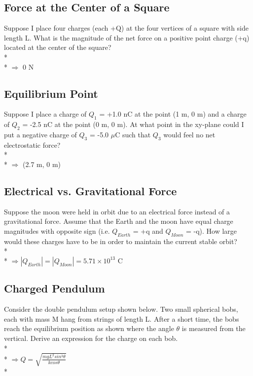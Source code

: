\documentclass[11pt]{article}
\begin{document}
\subsection{Force at the Center of a Square}
Suppose I place four charges (each +Q) at the four vertices of a square with side length L.  What is the magnitude of the net force on a positive point charge (+q) located at the center of the square? \\* \\*
$\Rightarrow$ 0 N

\subsection{Equilibrium Point}
Suppose I place a charge of $Q_1$ = +1.0 nC at the point (1 m, 0 m) and a charge of $Q_2$ = -2.5 nC at the point (0 m, 0 m).  At what point in the xy-plane could I put a negative charge of $Q_3$ = -5.0 $\mu$C such that $Q_3$ would feel no net electrostatic force? \\* \\*
$\Rightarrow$ (2.7 m, 0 m)

\subsection{Electrical vs. Gravitational Force}
Suppose the moon were held in orbit due to an electrical force instead of a gravitational force.  Assume that the Earth and the moon have equal charge magnitudes with opposite sign (i.e. $Q_{Earth}$ = +q and $Q_{Moon}$ = -q).  How large would these charges have to be in order to maintain the current stable orbit? \\* \\*
$\Rightarrow |Q_{Earth}| = |Q_{Moon}| = 5.71\times10^{13}$ C

\pagebreak
\subsection{Charged Pendulum}
Consider the double pendulum setup shown below.  Two small spherical bobs, each with mass M hang from strings of length L.  After a short time, the bobs reach the equilibrium position as shown where the angle $\theta$ is measured from the vertical.  Derive an expression for the charge on each bob.\\* \\*
$\Rightarrow Q = \sqrt{\frac{mgL^2sin^3\theta}{kcos\theta}}$ \\*
\end{document}
